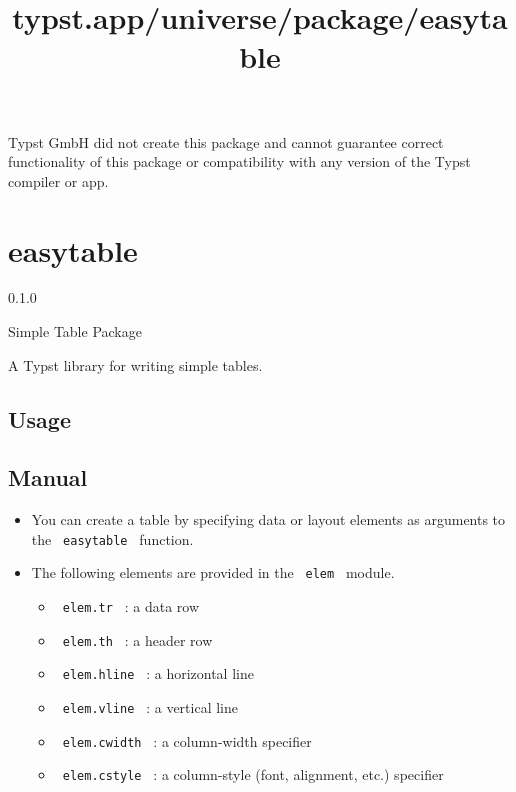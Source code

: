 Typst GmbH did not create this package and cannot guarantee correct
functionality of this package or compatibility with any version of the
Typst compiler or app.


\title{typst.app/universe/package/easytable}

\label{banner}
\section{easytable}\label{easytable}

{ 0.1.0 }

Simple Table Package

\label{readme}
A Typst library for writing simple tables.

\subsection{Usage}\label{usage}

\begin{Shaded}
\begin{Highlighting}[]
\end{Highlighting}
\end{Shaded}

\subsection{Manual}\label{manual}

\begin{itemize}
\tightlist
\item
  You can create a table by specifying data or layout elements as
  arguments to the \texttt{\ easytable\ } function.
\item
  The following elements are provided in the \texttt{\ elem\ } module.

  \begin{itemize}
  \tightlist
  \item
    \texttt{\ elem.tr\ } : a data row
  \item
    \texttt{\ elem.th\ } : a header row
  \item
    \texttt{\ elem.hline\ } : a horizontal line
  \item
    \texttt{\ elem.vline\ } : a vertical line
  \item
    \texttt{\ elem.cwidth\ } : a column-width specifier
  \item
    \texttt{\ elem.cstyle\ } : a column-style (font, alignment, etc.)
    specifier
  \end{itemize}
\end{itemize}

